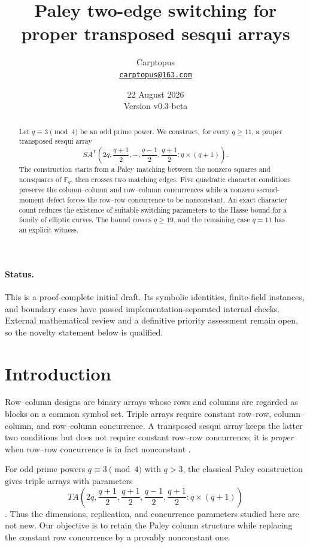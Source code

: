 \documentclass[11pt]{article}
\title{Paley two-edge switching for proper transposed sesqui arrays}
\author{Carptopus\\\href{mailto:carptopus@163.com}{\texttt{carptopus@163.com}}}
\date{22 August 2026\\\small Version v0.3-beta}
\theoremstyle{definition}
\theoremstyle{remark}
\newcommand{\F}{\mathbb F}
\newcommand{\SA}{SA^{\mathsf T}}
\begin{document}
\maketitle

\begin{abstract}
Let \(q\equiv3\pmod4\) be an odd prime power.  We construct, for every
\(q\geq11\), a proper transposed sesqui array
\[
 \SA\!\left(
 2q,\frac{q+1}{2},-,\frac{q-1}{2},\frac{q+1}{2}:q\times(q+1)
 \right).
\]
The construction starts from a Paley matching between the nonzero squares
and nonsquares of \(\F_q\), then crosses two matching edges.  Five quadratic
character conditions preserve the column--column and row--column
concurrences while a nonzero second-moment defect forces the row--row
concurrence to be nonconstant.  An exact character count reduces the
existence of suitable switching parameters to the Hasse bound for a family
of elliptic curves.  The bound covers \(q\geq19\), and the remaining case
\(q=11\) has an explicit witness.
\end{abstract}

\paragraph{Status.}
This is a proof-complete initial draft.  Its symbolic identities, finite-field
instances, and boundary cases have passed implementation-separated internal
checks.  External mathematical review and a definitive priority assessment
remain open, so the novelty statement below is qualified.

\section{Introduction}
Row--column designs are binary arrays whose rows and columns are regarded as
blocks on a common symbol set.  Triple arrays require constant row--row,
column--column, and row--column concurrence.  A transposed sesqui array keeps
the latter two conditions but does not require constant row--row concurrence;
it is \emph{proper} when row--row concurrence is in fact nonconstant
\cite{jager-enumeration}.

For odd prime powers \(q\equiv3\pmod4\) with \(q>3\), the classical Paley construction
gives triple arrays with parameters
\[
 TA\!\left(
 2q,\frac{q+1}{2},\frac{q+1}{2},\frac{q-1}{2},
 \frac{q+1}{2}:q\times(q+1)
 \right)
\]
\cite{preece-paley,nilson-intercalates}.  Thus the dimensions, replication,
and concurrence parameters studied here are not new.  Our objective is to
retain the Paley column structure while replacing the constant row
concurrence by a provably nonconstant one.
\end{document}
